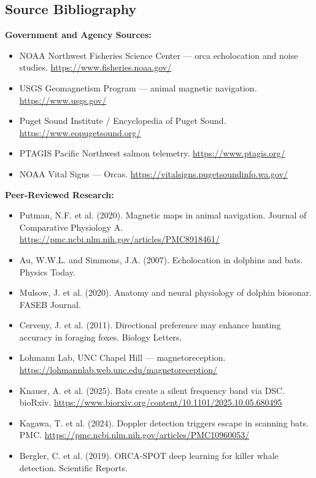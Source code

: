 \documentclass[11pt,letterpaper]{article}
\begin{document}
\subsection{Source Bibliography}

\textbf{Government and Agency Sources:}
\begin{itemize}[noitemsep]
  \item NOAA Northwest Fisheries Science Center --- orca echolocation and noise studies. \url{https://www.fisheries.noaa.gov/}
  \item USGS Geomagnetism Program --- animal magnetic navigation. \url{https://www.usgs.gov/}
  \item Puget Sound Institute / Encyclopedia of Puget Sound. \url{https://www.eopugetsound.org/}
  \item PTAGIS Pacific Northwest salmon telemetry. \url{https://www.ptagis.org/}
  \item NOAA Vital Signs --- Orcas. \url{https://vitalsigns.pugetsoundinfo.wa.gov/}
\end{itemize}

\textbf{Peer-Reviewed Research:}
\begin{itemize}[noitemsep]
  \item Putman, N.F. et al. (2020). Magnetic maps in animal navigation. Journal of Comparative Physiology A. \url{https://pmc.ncbi.nlm.nih.gov/articles/PMC8918461/}
  \item Au, W.W.L. and Simmons, J.A. (2007). Echolocation in dolphins and bats. Physics Today.
  \item Mulsow, J. et al. (2020). Anatomy and neural physiology of dolphin biosonar. FASEB Journal.
  \item Cerveny, J. et al. (2011). Directional preference may enhance hunting accuracy in foraging foxes. Biology Letters.
  \item Lohmann Lab, UNC Chapel Hill --- magnetoreception. \url{https://lohmannlab.web.unc.edu/magnetoreception/}
  \item Knauer, A. et al. (2025). Bats create a silent frequency band via DSC. bioRxiv. \url{https://www.biorxiv.org/content/10.1101/2025.10.05.680495}
  \item Kagawa, T. et al. (2024). Doppler detection triggers escape in scanning bats. PMC. \url{https://pmc.ncbi.nlm.nih.gov/articles/PMC10960053/}
  \item Bergler, C. et al. (2019). ORCA-SPOT deep learning for killer whale detection. Scientific Reports.
\end{itemize}
\end{document}
